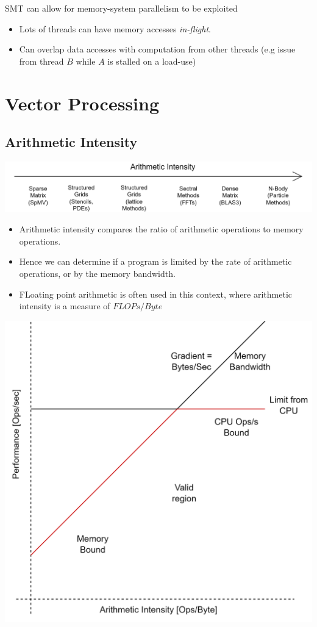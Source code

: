 SMT can allow for memory-system parallelism to be exploited
\begin{itemize}
    \item Lots of threads can have memory accesses \textit{in-flight}.
    \item Can overlap data accesses with computation from other threads (e.g issue from thread $B$ while $A$ is stalled on a load-use)
\end{itemize}

\unfinished

\section{Vector Processing}


\subsection{Arithmetic Intensity}
\begin{center}
    \includegraphics[width=\textwidth]{exploiting_parallelism/images/arithmetic_intensity.drawio.png}
\end{center}
\begin{itemize}
    \item Arithmetic intensity compares the ratio of arithmetic operations to memory operations.
    \item Hence we can determine if a program is limited by the rate of arithmetic operations, or by the memory bandwidth.
    \item FLoating point arithmetic is often used in this context, where arithmetic intensity is a measure of $FLOPs/Byte$
\end{itemize}
\begin{center}
    \includegraphics[width=.6\textwidth]{exploiting_parallelism/images/roofline_model.drawio.png}
\end{center}

